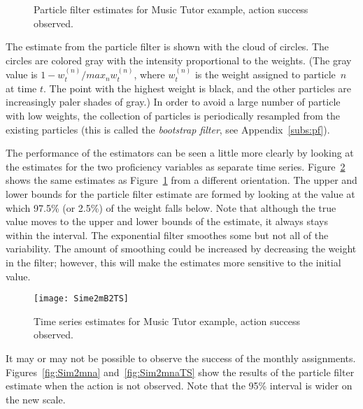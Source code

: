 \documentclass[12pt]{RR-article}
\begin{document}
\begin{figure}[ht]
\begin{centering}
\caption{Particle filter estimates for Music Tutor example, action
  success observed.}  
\label{fig:Sim2m}
\end{centering}
\end{figure}

The estimate from the particle filter is shown with the cloud of
circles.  The circles are colored gray with the intensity proportional
to the weights.  (The gray value is $1-w^{(n)}_t/max_n w^{(n)}_t$,
where $w^{(n)}_t$ is the weight assigned to particle~$n$ at time $t$.
The point with the highest weight is black, and the other particles are
increasingly paler shades of gray.)  In order to avoid a
large number of particle with low weights, the collection of particles
is periodically resampled from the existing particles (this is called
the \textit{bootstrap filter}, see Appendix~\ref{subs:pf}).

The performance of the estimators can be seen a little more clearly by
looking at the estimates for the two proficiency variables as separate
time series.  Figure~\ref{fig:Sim2mTS} shows the same estimates as
Figure~\ref{fig:Sim2m} from a different orientation.  The upper and
lower bounds for the particle filter estimate are formed by looking at
the value at which 97.5\% (or 2.5\%) of the weight falls below.  Note
that although the true value moves to the upper and lower bounds of
the estimate, it always stays within the interval.  The exponential
filter smoothes some but not all of the variability.  The amount of
smoothing could be increased by decreasing the weight in the filter;
however, this will make the estimates more sensitive to the initial
value.

\begin{figure}[p]
\centerline{\texttt{[image: Sime2mB2TS]}}
\caption{Time series estimates for Music Tutor example, action success
observed.}
\label{fig:Sim2mTS}
\end{figure}


It may or may not be possible to observe the success of the monthly
assignments.  Figures~\ref{fig:Sim2mna}  and~\ref{fig:Sim2mnaTS} show the
results of the particle filter estimate when the action is not
observed.  Note that the 95\% interval is wider on the new scale.
\end{document}
